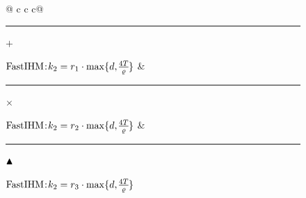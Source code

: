 \documentclass[11pt]{article}
\theoremstyle{definition}
\theoremstyle{plain}
\newcommand{\bm}[1]{\mbox{\boldmath{$#1$}}}
\begin{document}
\begin{figure}[t]
\begin{subfigure}[t]{0.27\textwidth}
  \end{subfigure}\hspace{0.01\textwidth}%
    {\footnotesize
        \setlength{\tabcolsep}{2pt}%
        \renewcommand{\arraystretch}{0.9}%
        \begin{tabular*}{\linewidth}{@{\extracolsep{\fill}} c c c@{}}
        \textcolor{FastIHMColorA}{\rule{12pt}{1.6pt}$\pmb{+}$}
        $\mathrm{FastIHM}\hspace{-0.2em}:\hspace{-0.2em}
        k_2 = r_1 \cdot \max\{d,\hspace{-0.1em}\frac{4T}{\varrho}\hspace{-0.1em}\}$
        &
        \textcolor{FastIHMColorB}{\rule{12pt}{1.6pt}$\pmb{\times}$}
        $\mathrm{FastIHM}\hspace{-0.2em}:\hspace{-0.2em}
        k_2 = r_2 \cdot \max\{d,\hspace{-0.1em}\frac{4T}{\varrho}\hspace{-0.1em}\}$
        &
        \textcolor{FastIHMColorC}{\rule{12pt}{1.6pt}$\bm{\blacktriangle}$}
        $\mathrm{FastIHM}\hspace{-0.2em}:\hspace{-0.2em}
        k_2 = r_3 \cdot \max\{d,\hspace{-0.1em}\frac{4T}{\varrho}\hspace{-0.1em}\}$
        \\[-0.125em]
        \end{tabular*}
    }
    

\end{figure}
\end{document}
